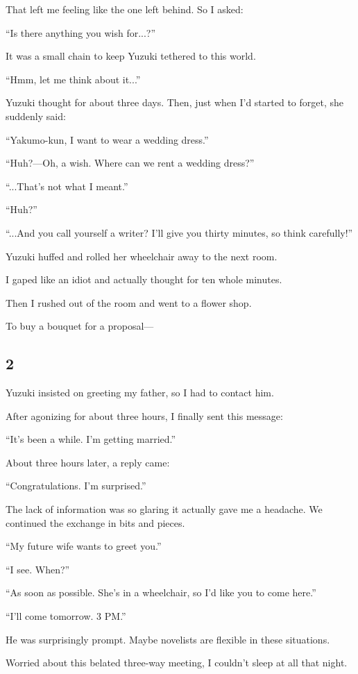 \documentclass[
    a4paper,
    12pt,
    twoside,
    openany,
    UTF8,
    fontset=windows
]{ctexbook}
\begin{document}
That left me feeling like the one left behind. So I asked:

``Is there anything you wish for...?''

It was a small chain to keep Yuzuki tethered to this world.

``Hmm, let me think about it...''

Yuzuki thought for about three days. Then, just when I'd started to forget, she suddenly said:

``Yakumo-kun, I want to wear a wedding dress.''

``Huh?---Oh, a wish. Where can we rent a wedding dress?''

``...That's not what I meant.''

``Huh?''

``...And you call yourself a writer? I'll give you thirty minutes, so think carefully!''

Yuzuki huffed and rolled her wheelchair away to the next room.

I gaped like an idiot and actually thought for ten whole minutes.

Then I rushed out of the room and went to a flower shop.

To buy a bouquet for a proposal---


\subsection*{2}

Yuzuki insisted on greeting my father, so I had to contact him.

After agonizing for about three hours, I finally sent this message:

``It's been a while. I'm getting married.''

About three hours later, a reply came:

``Congratulations. I'm surprised.''

The lack of information was so glaring it actually gave me a headache. We continued the exchange in bits and pieces.

``My future wife wants to greet you.''

``I see. When?''

``As soon as possible. She's in a wheelchair, so I'd like you to come here.''

``I'll come tomorrow. 3 PM.''

He was surprisingly prompt. Maybe novelists are flexible in these situations.

Worried about this belated three-way meeting, I couldn't sleep at all that night.
\end{document}
